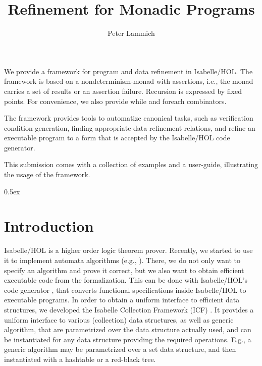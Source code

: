 \documentclass[11pt,a4paper]{book}
\makeatletter
\newenvironment{abstract}{%
  \small
  \begin{center}%
    {\bfseries \abstractname\vspace{-.5em}\vspace{\z@}}%
  \end{center}%
  \quotation}{\endquotation}
\makeatother
\begin{document}
\title{Refinement for Monadic Programs}
\author{Peter Lammich}
\maketitle

\begin{abstract}
  We provide a framework for program and data refinement in Isabelle/HOL.
  The framework is based on a nondeterminism-monad with assertions, i.e.,
  the monad carries a set of results or an assertion failure.
  Recursion is expressed by fixed points. For convenience, we also provide
  while and foreach combinators.

  The framework provides tools to automatize canonical tasks, such as 
  verification condition generation, finding appropriate data refinement relations,
  and refine an executable program to a form that is accepted by the 
  Isabelle/HOL code generator.

  This submission comes with a collection of examples and a user-guide, 
  illustrating the usage of the framework.
\end{abstract}

\clearpage
\tableofcontents

\clearpage

\parindent 0pt\parskip 0.5ex

\chapter{Introduction}
Isabelle/HOL\cite{NPW02} is a higher order logic theorem prover. Recently, we
started to use it to implement automata algorithms 
(e.g., \cite{L09_tree_automata}).
There, we do not only want to specify an algorithm and prove it correct, but
we also want to obtain efficient executable code from the formalization.
This can be done with Isabelle/HOL's code generator \cite{Haft09,HaNi10}, that 
converts
functional specifications inside Isabelle/HOL to executable programs. In order
to obtain a uniform interface to efficient data structures, we developed the
Isabelle Collection Framework (ICF) \cite{L09_collections,LL10}. 
It provides a uniform interface to various (collection) data structures, as well
as generic algorithm, that are parametrized over the data structure actually used,
and can be instantiated for any data structure providing the required operations.
E.g., a generic algorithm may be parametrized over a set data structure, and then
instantiated with a hashtable or a red-black tree.
\end{document}
